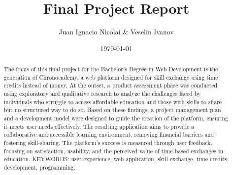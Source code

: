 \documentclass{report}
\title{Final Project Report}
\author{Juan Ignacio Nicolai \& Veselin Ivanov}
\date{\today}
\begin{document}
    \begin{abstract}
    The focus of this final project for the Bachelor’s Degree in Web Development is the generation of Chronocademy, a web platform designed for skill exchange using time credits instead of money.
    At the outset, a product assessment phase was conducted using exploratory and qualitative research to analyze the challenges faced by individuals who struggle to access affordable education and those with skills to share but no structured way to do so.
    Based on these findings, a project management plan and a development model were designed to guide the creation of the platform, ensuring it meets user needs effectively.
    The resulting application aims to provide a collaborative and accessible learning environment, removing financial barriers and fostering skill-sharing.
    The platform’s success is measured through user feedback, focusing on satisfaction, usability, and the perceived value of time-based exchanges in education.
    \newline
    \newline
    KEYWORDS: user experience, web application, skill exchange, time credits, development, programming.
    \end{abstract}

\maketitle
\tableofcontents



\appendix




\end{document}
